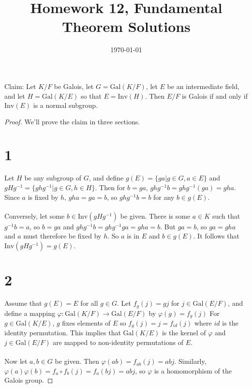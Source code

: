 \documentclass{article}
\title{\textbf{Homework 12, Fundamental Theorem Solutions}}
\date{}
\date\today
\begin{document}
\maketitle %

\thispagestyle{firstpage}

Claim: Let $K/F$ be Galois, let $G = \mathrm{Gal}(K/F)$, let $E$ be an intermediate 
field, and let $H = \mathrm{Gal}(K/E)$ so that $E = \mathrm{Inv}(H)$.  
Then $E/F$ is Galois if and only if $\mathrm{Inv}(E)$ is a normal subgroup.

\begin{proof} 
    We'll prove the claim in three sections.
    \section*{1}
    
    Let $H$ be any subgroup of $G$, and define $g(E) = \{ ga | g \in G, a \in E \}$ and 
    $gHg^{-1} = \{ ghg^{-1} | g \in G, h \in H \}$.  Then 
    for $b = ga$, $ghg^{-1}b = ghg^{-1}(ga) = gha$.  Since $a$ is fixed by 
    $h$, $gha = ga = b$, so $ghg^{-1}b = b$ for any $b \in g(E)$. \\ 
    \\
    Conversely, let some $b \in \mathrm{Inv}(gHg^{-1})$ be given.
    There is some $a \in K$ such that $g^{-1}b = a$, so $b = ga$ and 
    $ghg^{-1}b = ghg^{-1}ga = gha = b$.  But $ga = b$, so $ga = gha$ and 
    $a$ must therefore be fixed by $h$.  So $a$ is in $E$ and $b \in g(E)$.  
    It follows that $\mathrm{Inv}(gHg^{-1}) = g(E)$.

    \section*{2} 

    Assume that $g(E) = E$ for all $g \in G$.  Let $f_g(j) = gj$ 
    for $j \in \mathrm{Gal}(E/F)$, and define a mapping 
    $\varphi : \mathrm{Gal}(K/F) \rightarrow \mathrm{Gal}(E/F)$ by 
    $\varphi(g) = f_g(j)$  For $g \in \mathrm{Gal}(K/E)$, $g$ fixes 
    elements of $E$ so $f_g(j) = j = f_{id}(j)$ where $id$ is the identity 
    permutation.  This implies that $\mathrm{Gal}(K/E)$ is the kernel of 
    $\varphi$ and $j \in \mathrm{Gal}(E/F)$ are mapped to non-identity 
    permutations of $E$. \\ 
    \\ 
    Now let $a, b \in G$ be given.  Then $\varphi(ab) = f_{ab}(j) = abj$. 
    Similarly, $\varphi(a)\varphi(b) = f_a \circ f_b(j) = f_a(bj) = abj$, so 
    $\varphi$ is a homomorphism of the Galois group.  


\end{proof}
\end{document}
